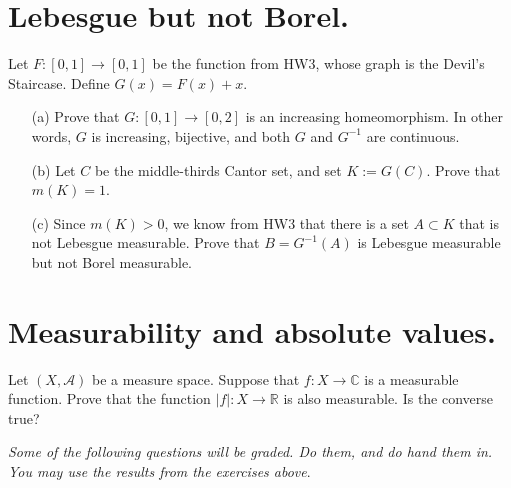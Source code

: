 \documentclass[lang=cn,11pt]{elegantbook}
\begin{document}
\section{Lebesgue but not Borel.}
  Let $F\colon[0,1]\to[0,1]$ be the function from HW3, whose graph is the Devil's Staircase. Define $G(x)=F(x)+x$. 
  \begin{itemize}
  \item[(a)]
    Prove that $G:[0,1]\to [0,2]$ is an increasing homeomorphism. In other words, $G$ is increasing, bijective, and both $G$ and $G^{-1}$ are continuous. 
  \item[(b)]
    Let $C$ be the middle-thirds Cantor set, and set $K:=G(C)$. Prove that $m(K)=1$. 
  \item[(c)]
    Since $m(K)>0$, we know from HW3 that there is a set $A\subset K$ that is not 
    Lebesgue measurable. Prove that $B=G^{-1}(A)$ is Lebesgue measurable but not 
    Borel measurable. 
  \end{itemize}

\section{Measurability and absolute values.}
  Let $(X,\mathcal{A})$ be a measure space. 
  Suppose that $f\colon X\to\mathbb{C}$ is a measurable function. Prove that the function $|f|\colon X\to\mathbb{R}$ is also measurable. Is the converse true? 



  
\begin{center}
\textit{Some of the following questions will be graded. Do them, and do hand them in. You may use the results from the exercises above}.
\end{center}
\end{document}
